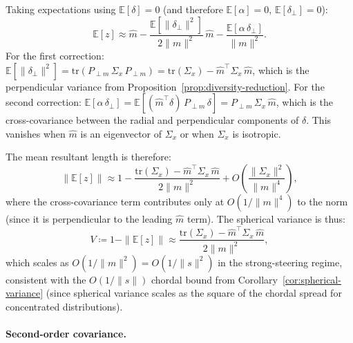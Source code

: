 Taking expectations using $\mathbb{E}[\delta] = 0$ (and therefore
$\mathbb{E}[\alpha] = 0$, $\mathbb{E}[\delta_\perp] = 0$):
%
\begin{equation}
  \mathbb{E}[z]
  \approx \hat{m}
  - \frac{\mathbb{E}[\|\delta_\perp\|^2]}{2\|m\|^2}\,\hat{m}
  - \frac{\mathbb{E}[\alpha\,\delta_\perp]}{\|m\|^2}.
  \label{eq:mean-second}
\end{equation}
%
For the first correction:
$\mathbb{E}[\|\delta_\perp\|^2]
= \mathrm{tr}(P_{\perp m}\,\Sigma_x\,P_{\perp m})
= \mathrm{tr}(\Sigma_x) - \hat{m}^\top\Sigma_x\,\hat{m}$,
which is the perpendicular variance from
Proposition~\ref{prop:diversity-reduction}.
For the second correction:
$\mathbb{E}[\alpha\,\delta_\perp]
= \mathbb{E}[(\hat{m}^\top\delta)\,P_{\perp m}\,\delta]
= P_{\perp m}\,\Sigma_x\,\hat{m}$,
which is the cross-covariance between the radial and perpendicular
components of $\delta$.
This vanishes when $\hat{m}$ is an eigenvector of $\Sigma_x$
or when $\Sigma_x$ is isotropic.

The mean resultant length is therefore:
%
\begin{equation}
  \|\mathbb{E}[z]\|
  \approx 1
  - \frac{\mathrm{tr}(\Sigma_x) - \hat{m}^\top\Sigma_x\,\hat{m}}{2\|m\|^2}
  + O\!\left(\frac{\|\Sigma_x\|^2}{\|m\|^4}\right),
  \label{eq:resultant-length}
\end{equation}
%
where the cross-covariance term contributes only at $O(1/\|m\|^4)$
to the norm (since it is perpendicular to the leading $\hat{m}$ term).
The spherical variance is thus:
%
\begin{equation}
  V \coloneqq 1 - \|\mathbb{E}[z]\|
  \approx \frac{\mathrm{tr}(\Sigma_x) - \hat{m}^\top\Sigma_x\,\hat{m}}{2\|m\|^2},
  \label{eq:spherical-variance-taylor}
\end{equation}
%
which scales as $O(1/\|m\|^2) = O(1/\|s\|^2)$ in the strong-steering
regime, consistent with the $O(1/\|s\|)$ chordal bound from
Corollary~\ref{cor:spherical-variance} (since spherical variance scales
as the square of the chordal spread for concentrated distributions).

\paragraph{Second-order covariance.}

